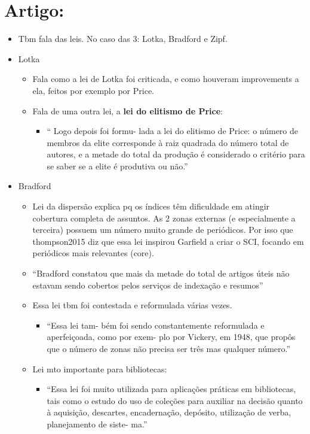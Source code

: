 \documentclass[11pt]{article}
\begin{document}
\section{Artigo: \cite{araujo2006}}
\label{sec:org8bdcf75}
\begin{itemize}
\item Tbm fala das leis. No caso das 3: Lotka, Bradford e Zipf.
\item Lotka
\begin{itemize}
\item Fala como a lei de Lotka foi criticada, e como houveram improvements a ela, feitos por exemplo por Price.
\item Fala de uma outra lei, a \textbf{lei do elitismo de Price}:
\begin{itemize}
\item `` Logo depois foi formu- lada a lei do elitismo de Price: o número de membros da elite corresponde à raiz quadrada do número total de autores, e a metade do total da produção é considerado o critério para se saber se a elite é produtiva ou não.''
\end{itemize}
\end{itemize}
\item Bradford
\begin{itemize}
\item Lei da dispersão explica pq os índices têm dificuldade em atingir cobertura completa de assuntos. As 2 zonas externas (e especialmente a terceira) possuem um número muito grande de periódicos. Por isso que thompson2015 diz que essa lei inspirou Garfield a criar o SCI, focando em periódicos mais relevantes (core).
\item ``Bradford constatou que mais da metade do total de artigos úteis não estavam sendo cobertos pelos serviços de indexação e resumos''
\item Essa lei tbm foi contestada e reformulada várias vezes.
\begin{itemize}
\item ``Essa lei tam- bém foi sendo constantemente reformulada e aperfeiçoada, como por exem- plo por Vickery, em 1948, que propôs que o número de zonas não precisa ser três mas qualquer número.''
\end{itemize}
\item Lei mto importante para bibliotecas:
\begin{itemize}
\item ``Essa lei foi muito utilizada para aplicações práticas em bibliotecas, tais como o estudo do uso de coleções para auxiliar na decisão quanto à aquisição, descartes, encadernação, depósito, utilização de verba, planejamento de siste- ma.''

\end{itemize}
\end{itemize}
\end{itemize}
\end{document}
